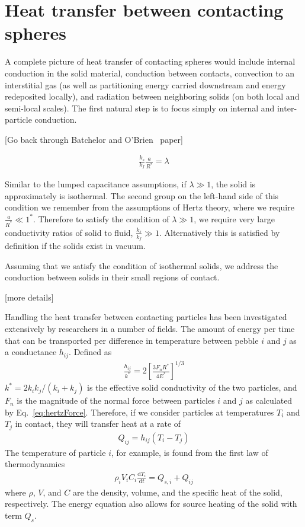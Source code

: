 \section{Heat transfer between contacting spheres}

A complete picture of heat transfer of contacting spheres would include internal conduction in the solid material, conduction between contacts, convection to an interstitial gas (as well as partitioning energy carried downstream and energy redeposited locally), and radiation between neighboring solids (on both local and semi-local scales). The first natural step is to focus simply on internal and inter-particle conduction.

[Go back through Batchelor and O'Brien~\cite{Batchelor1977} paper]

\begin{align}
\frac{ k_s }{ k_f } \frac{a}{R^*} = \lambda
\end{align}

Similar to the lumped capacitance assumptions, if $\lambda \gg 1$, the solid is approximately is isothermal. The second group on the left-hand side of this condition we remember from the assumptions of Hertz theory, where we require $\frac{a}{R^*} \ll 1^*$. Therefore to satisfy the condition of $\lambda \gg 1$, we require very large conductivity ratios of solid to fluid, $\frac{k_s}{k_f} \gg 1$. Alternatively this is satisfied by definition if the solids exist in vacuum.

Assuming that we satisfy the condition of isothermal solids, we address the conduction between solids in their small regions of contact.

[more details]

Handling the heat transfer between contacting particles has been investigated extensively by researchers in a number of fields\cite{Zhou2009,Zhang2011,Wu2011,Vargas2001,Li2000,Chaudhuri2006}. The amount of energy per time that can be transported per difference in temperature between pebble $i$ and $j$ as a conductance $h_{ij}$. Defined as
\begin{align}\label{conductance}
\frac{h_{ij}}{k^*}= 2\left[\frac{3F_nR^*}{4E^*}\right]^{1/3}
\end{align}
$k^*= 2k_ik_j/(k_i+k_j)$ is the effective solid conductivity of the two particles, and $F_n$ is the magnitude of the normal force between particles $i$ and $j$ as calculated by Eq.~\ref{eq:hertzForce}. Therefore, if we consider particles at temperatures $T_i$ and $T_j$ in contact, they will transfer heat at a rate of
\begin{align}
Q_{ij} = h_{ij}(T_i - T_j)
\end{align} 
The temperature of particle $i$, for example, is found from the first law of thermodynamics
\begin{align}\label{thermoFirstLaw}
\rho_iV_iC_i\frac{\mathrm{d}T_i}{\mathrm{d}t} = Q_{s,i} + Q_{ij}
\end{align}
where $\rho$, $V$, and $C$ are the density, volume, and the specific heat of the solid, respectively. The energy equation also allows for source heating of the solid with term $Q_{s}$.